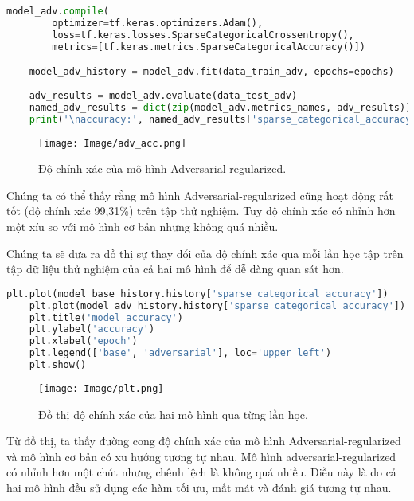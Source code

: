 \begin{lstlisting}[language=Python]
    model_adv.compile(
        optimizer=tf.keras.optimizers.Adam(),
        loss=tf.keras.losses.SparseCategoricalCrossentropy(),
        metrics=[tf.keras.metrics.SparseCategoricalAccuracy()])

    model_adv_history = model_adv.fit(data_train_adv, epochs=epochs)
    
    adv_results = model_adv.evaluate(data_test_adv)
    named_adv_results = dict(zip(model_adv.metrics_names, adv_results))
    print('\naccuracy:', named_adv_results['sparse_categorical_accuracy'])

\end{lstlisting}

\begin{figure}[h!]
    \centering
    \texttt{[image: Image/adv\_acc.png]}
    \caption{Độ chính xác của mô hình Adversarial-regularized.}
    \label{fig 2.3:Độ chính xác của mô hình Adversarial-regularized}
\end{figure}

Chúng ta có thể thấy rằng mô hình Adversarial-regularized cũng hoạt động rất tốt (độ chính xác 99,31\%) trên tập thử nghiệm. Tuy độ chính xác có nhỉnh hơn một xíu so với mô hình cơ bản
nhưng không quá nhiều.

Chúng ta sẽ đưa ra đồ thị sự thay đổi của độ chính xác qua mỗi lần học tập trên tập dữ liệu thử nghiệm của cả hai mô hình để dễ dàng quan sát hơn.
\begin{lstlisting}[language=Python]
    plt.plot(model_base_history.history['sparse_categorical_accuracy'])
    plt.plot(model_adv_history.history['sparse_categorical_accuracy'])
    plt.title('model accuracy')
    plt.ylabel('accuracy')
    plt.xlabel('epoch')
    plt.legend(['base', 'adversarial'], loc='upper left')
    plt.show()
\end{lstlisting}

\begin{figure}[h!]
    \centering
    \texttt{[image: Image/plt.png]}
    \caption{Đồ thị độ chính xác của hai mô hình qua từng lần học.}
    \label{fig 3.3:Đồ thị độ chính xác của hai mô hình qua từng lần học.}
    
\end{figure}

Từ đồ thị, ta thấy đường cong độ chính xác của mô hình Adversarial-regularized và mô hình cơ bản có xu hướng tương tự nhau. Mô hình adversarial-regularized có nhỉnh hơn một chút nhưng chênh lệch là không quá nhiều. 
Điều này là do cả hai mô hình đều sử dụng các hàm tối ưu, mất mát và đánh giá tương tự nhau.

